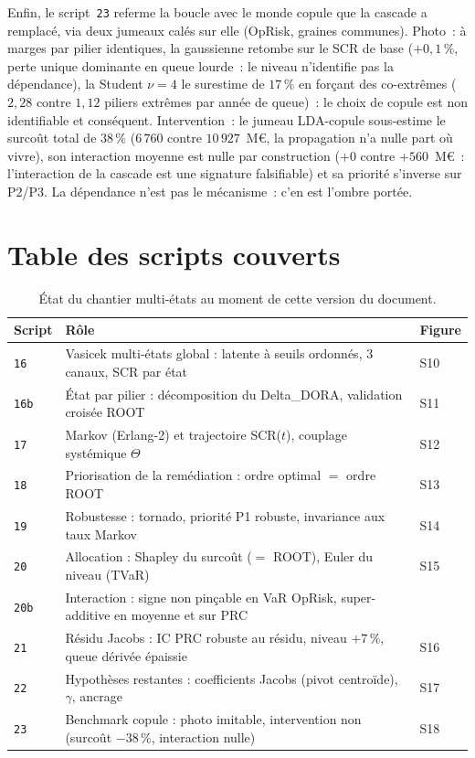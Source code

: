 \documentclass[11pt,a4paper]{article}
\begin{document}
Enfin, le script~\texttt{23} referme la boucle avec le monde copule que la cascade a
remplacé, via deux jumeaux calés sur elle (OpRisk, graines communes). Photo~: à marges par
pilier identiques, la gaussienne retombe sur le SCR de base ($+0{,}1\,\%$, perte unique
dominante en queue lourde~: le niveau n'identifie pas la dépendance), la Student $\nu = 4$
le surestime de $17\,\%$ en forçant des co-extrêmes ($2{,}28$ contre $1{,}12$ piliers
extrêmes par année de queue)~: le choix de copule est non identifiable et conséquent.
Intervention~: le jumeau LDA-copule sous-estime le surcoût total de $38\,\%$ ($6\,760$
contre $10\,927$~M\euro, la propagation n'a nulle part où vivre), son interaction moyenne
est nulle par construction ($+0$ contre $+560$~M\euro~: l'interaction de la cascade est une
signature falsifiable) et sa priorité s'inverse sur P2/P3. La dépendance n'est pas le
mécanisme~: c'en est l'ombre portée.

\section*{Table des scripts couverts}

\begin{table}[h]\centering\small
\renewcommand{\arraystretch}{1.25}
\begin{tabularx}{\linewidth}{@{}l X l@{}}
\toprule
Script & Rôle & Figure \\
\midrule
\texttt{16}  & Vasicek multi-états global : latente à seuils ordonnés, 3 canaux, SCR par état & S10 \\
\texttt{16b} & État par pilier : décomposition du Delta\_DORA, validation croisée ROOT & S11 \\
\texttt{17}  & Markov (Erlang-2) et trajectoire SCR($t$), couplage systémique $\Theta$ & S12 \\
\texttt{18}  & Priorisation de la remédiation : ordre optimal $=$ ordre ROOT & S13 \\
\texttt{19}  & Robustesse : tornado, priorité P1 robuste, invariance aux taux Markov & S14 \\
\texttt{20}  & Allocation : Shapley du surcoût ($=$ ROOT), Euler du niveau (TVaR) & S15 \\
\texttt{20b} & Interaction : signe non pinçable en VaR OpRisk, super-additive en moyenne et sur PRC & \textendash{} \\
\texttt{21}  & Résidu Jacobs : IC PRC robuste au résidu, niveau $+7\,\%$, queue dérivée épaissie & S16 \\
\texttt{22}  & Hypothèses restantes : coefficients Jacobs (pivot centroïde), $\gamma$, ancrage & S17 \\
\texttt{23}  & Benchmark copule : photo imitable, intervention non (surcoût $-38\,\%$, interaction nulle) & S18 \\
\bottomrule
\end{tabularx}
\caption{État du chantier multi-états au moment de cette version du document.}
\end{table}
\end{document}
